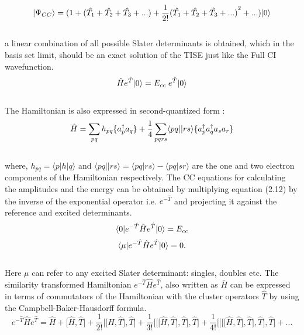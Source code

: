 \\
\begin{equation}
| \Psi_{CC} \rangle = (1+(\hat{T_1} + \hat{T_2} + \hat{T_3} + ... ) + \frac{1}{2!}{(\hat{T_1} + \hat{T_2} + \hat{T_3} + ...)}^2 + ... )| 0 \rangle
\end{equation}
\\
a linear combination of all possible Slater determinants is obtained, which in the basis set limit,  
should be an exact solution of the TISE just like the Full CI wavefunction. 
\\
\begin{equation}
\hat{H}e^{\hat{T}}| 0 \rangle = E_{cc}\;e^{\hat{T}}| 0 \rangle
\end{equation}
\\
The Hamiltonian is also expressed in second-quantized form \cite{Crawford00}:
\\
\begin{equation}
\hat{H} = \sum_{pq}h_{pq}\{a^\dagger_pa_q\} + \frac{1}{4}\sum_{pqrs}\langle pq || rs \rangle\{a^\dagger_pa^\dagger_qa_sa_r\}
\end{equation}
\\
where, $h_{pq} = \langle p|h|q \rangle$ and $\langle pq||rs \rangle = \langle pq|rs \rangle - \langle pq|sr \rangle$ are the one and two electron components of the Hamiltonian respectively.
The CC equations for calculating the amplitudes and the energy can be  
obtained by multiplying equation (2.12) by the inverse of the exponential operator i.e.
$e^{-\hat{T}}$ and projecting it against the reference and excited
determinants.
\\
\begin {equation}
\langle 0 |e^{-\hat{T}}\hat{H}e^{\hat{T}}| 0 \rangle = E_{cc}
\end{equation}
\begin{equation}
\langle \mu |e^{-\hat{T}}\hat{H}e^{\hat{T}}| 0 \rangle = 0 .
\end{equation} 
\\
Here $\mu$ can refer to any excited Slater determinant: singles, doubles etc. 
The similarity transformed Hamiltonian $e^{-\hat{T}}\hat{H}e^{\hat{T}}$, also written as 
$\bar{H}$ can be expressed in terms of commutators of the Hamiltonian with the 
cluster operators $\hat{T}$ by using the Campbell-Baker-Hausdorff formula\cite{Merzbacher70}.
\\
\begin{equation}
e^{-\hat{T}}\hat{H}e^{\hat{T}} = \hat{H} + \lbrack\hat{H},\hat{T}\rbrack + \frac{1}{2!}\lbrack\lbrack\hat{H},\hat{T}\rbrack,\hat{T}\rbrack + \frac{1}{3!}\lbrack\lbrack\lbrack\hat{H},\hat{T}\rbrack,\hat{T}\rbrack,\hat{T}\rbrack + \frac{1}{4!}\lbrack\lbrack\lbrack\lbrack\hat{H},\hat{T}\rbrack,\hat{T}\rbrack,\hat{T}\rbrack,\hat{T}\rbrack + ...
\end{equation}
